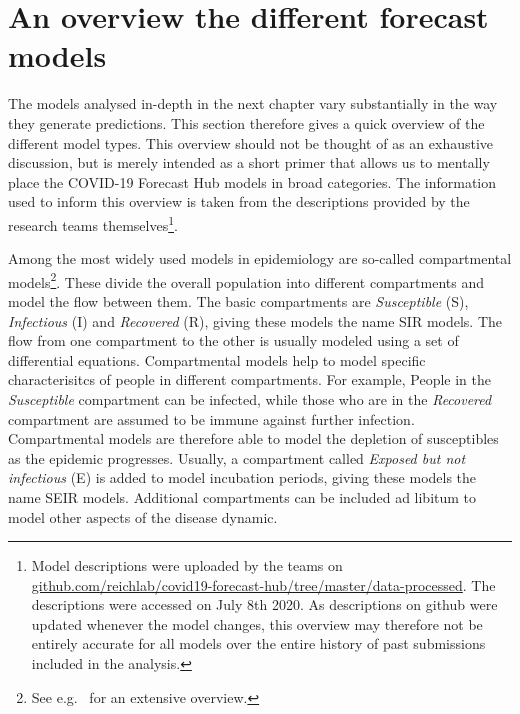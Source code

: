 \documentclass[
]{book}
\begin{document}
\hypertarget{an-overview-the-different-forecast-models}{%
\section{An overview the different forecast models}\label{an-overview-the-different-forecast-models}}

The models analysed in-depth in the next chapter vary substantially in the way they generate predictions. This section therefore gives a quick overview of the different model types. This overview should not be thought of as an exhaustive discussion, but is merely intended as a short primer that allows us to mentally place the COVID-19 Forecast Hub models in broad categories. The information used to inform this overview is taken from the descriptions provided by the research teams themselves\footnote{Model descriptions were uploaded by the teams on \href{https://github.com/reichlab/covid19-forecast-hub/tree/master/data-processed}{github.com/reichlab/covid19-forecast-hub/tree/master/data-processed}. The descriptions were accessed on July 8th 2020. As descriptions on github were updated whenever the model changes, this overview may therefore not be entirely accurate for all models over the entire history of past submissions included in the analysis.}.

Among the most widely used models in epidemiology are so-called compartmental models\footnote{See e.g.~\citet{brauerCompartmentalModelsEpidemiology2008} for an extensive overview.}. These divide the overall population into different compartments and model the flow between them. The basic compartments are \emph{Susceptible} (S), \emph{Infectious} (I) and \emph{Recovered} (R), giving these models the name SIR models. The flow from one compartment to the other is usually modeled using a set of differential equations. Compartmental models help to model specific characterisitcs of people in different compartments. For example, People in the \emph{Susceptible} compartment can be infected, while those who are in the \emph{Recovered} compartment are assumed to be immune against further infection. Compartmental models are therefore able to model the depletion of susceptibles as the epidemic progresses. Usually, a compartment called \emph{Exposed but not infectious} (E) is added to model incubation periods, giving these models the name SEIR models. Additional compartments can be included ad libitum to model other aspects of the disease dynamic.
\end{document}
